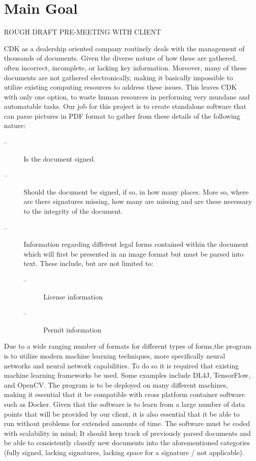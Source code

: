 \documentclass[onecolumn, draftclsnofoot,10pt, compsoc]{IEEEtran}
\begin{document}
\newpage
{}
\tableofcontents
\clearpage

\section{Main Goal}
	ROUGH DRAFT PRE-MEETING WITH CLIENT
	
	CDK as a dealership oriented company routinely deals with the management of thousands of documents. Given the diverse nature of how these are gathered,  often incorrect, incomplete, or lacking key information. Moreover, many of these documents are not gathered electronically, making it basically impossible to utilize existing computing resources to address these issues. This leaves CDK with only one option, to waste human resources in performing very mundane and automatable tasks. Our job for this project is to create standalone software that can parse pictures in PDF format to gather from these details of the following nature:
\begin{description}
	\item[--]Is the document signed.
	\item[--]Should the document be signed, if so, in how many places. More so, where are there signatures missing, how many are missing and are these necessary to the integrity of the document.
	\item[--]Information regarding different legal forms contained within the document which will first be presented in an image format but must be parsed into text. These include, but are not limited to:
	\begin{description}
		\item[--]License information
		\item[--]Permit information 
	\end{description}
\end{description}

Due to a wide ranging number of formats for different types of forms,the program is to utilize modern machine learning techniques, more specifically neural networks and neural network capabilities. To do so it is required that existing machine learning frameworks be used. Some examples include DL4J, TensorFlow, and OpenCV. The program is to be deployed on many different machines, making it essential that it be compatible with cross platform container software such as Docker. Given that the software is to learn from a large number of data points that will be provided by our client, it is also essential that it be able to run without problems for extended amounts of time. The software must be coded with scalability in mind; It should keep track of previously parsed documents and be able to consistently classify new documents into the aforementioned categories (fully signed, lacking signatures, lacking space for a signature / not applicable). 
\end{document}
